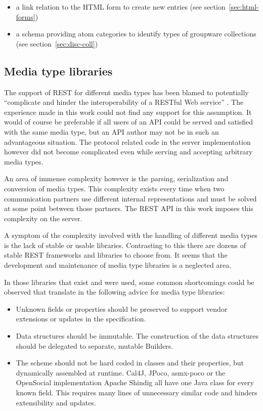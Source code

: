 \documentclass[11pt,a4paper,headsepline,twoside]{scrartcl}		%
\begin{document}
\begin{itemize}
\item a link relation to the HTML form to create new entries (see
  section~\ref{sec:html-forms})
\item a schema providing atom categories to identify types of groupware
  collections (see section~\ref{sec:disc-coll})
\end{itemize}

\subsection{Media type libraries}
\label{sec:mediatype-libraries}

The support of REST for different media types has been blamed to potentially
``complicate and hinder the interoperability of a RESTful Web
service'' \cite[sec. 7.2]{Pautasso2008}. The experience made
in this work could not find any support for this assumption. It would of course
be preferable if all users of an API could be served and satisfied with the
same media type, but an API author may not be in such an advantageous
situation. The protocol related code in the server implementation however did
not become complicated even while serving and accepting arbitrary media types.

An area of immense complexity however is the parsing, serialization and
conversion of media types. This complexity exists every time when two
communication partners use different internal representations and must be solved
at some point between those partners. The REST API in this work imposes this
complexity on the server.

A symptom of the complexity involved with the handling of different media types
is the lack of stable or usable libraries. Contrasting to this there are dozens
of stable REST frameworks and libraries to choose from. It seems that the
development and maintenance of media type libraries is a neglected area.

In those libraries that exist and were used, some common shortcomings could be
observed that translate in the following advice for media type libraries:

\begin{itemize}
\item Unknown fields or properties should be preserved to support vendor
  extensions or updates in the specification.
\item Data structures should be immutable. The construction of the data
  structures should be delegated to separate, mutable Builders.
\item The scheme should not be hard coded in classes and their properties, but
  dynamically assembled at runtime. Cal4J, JPoco, asmx-poco or the OpenSocial
  implementation Apache Shindig all have one Java class for every known field.
  This requires many lines of unnecessary similar code and hinders extensibility
  and updates.
\end{itemize}
\end{document}
